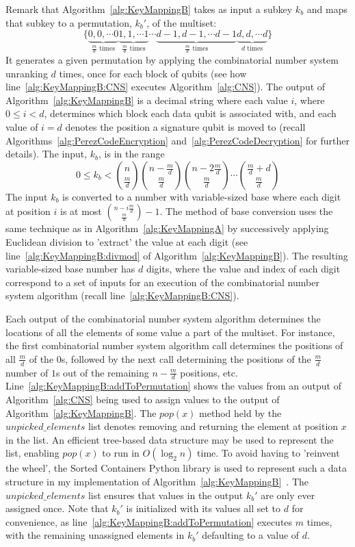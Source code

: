 Remark that Algorithm~\ref{alg:KeyMappingB} takes as input a subkey $k_b$ and maps that subkey to a permutation, $k_b'$, of the multiset:
\begin{equation}
    \{\underbrace{0, 0, \cdots 0}_{\frac{m}{d} \text{ times}}\underbrace{1, 1, \cdots 1}_{\frac{m}{d} \text{ times}}\cdots\underbrace{d-1, d-1, \cdots d-1}_{\frac{m}{d} \text{ times}}\underbrace{d, d, \cdots d}_{d \text{ times}}\}
\end{equation}
It generates a given permutation by applying the combinatorial number system unranking $d$ times, once for each block of qubits (see how line~\ref{alg:KeyMappingB:CNS} executes Algorithm~\ref{alg:CNS}). The output of Algorithm~\ref{alg:KeyMappingB} is a decimal string where each value $i$, where $0 \leq i < d$, determines which block each data qubit is associated with, and each value of $i = d$ denotes the position a signature qubit is moved to (recall Algorithms~\ref{alg:PerezCodeEncryption} and~\ref{alg:PerezCodeDecryption} for further details). 
The input, $k_b$, is in the range $$0 \leq k_b < {n \choose \frac{m}{d}}{n - \frac{m}{d} \choose \frac{m}{d}}{n - 2\frac{m}{d} \choose \frac{m}{d}}\cdots{\frac{m}{d} + d \choose \frac{m}{d}}$$ The input $k_b$ is converted to a number with variable-sized base where each digit at position $i$ is at most ${n - i\frac{m}{d} \choose \frac{m}{d}} - 1$. The method of base conversion uses the same technique as in Algorithm~\ref{alg:KeyMappingA} by successively applying Euclidean division to 'extract' the value at each digit (see line~\ref{alg:KeyMappingB:divmod} of Algorithm~\ref{alg:KeyMappingB}). The resulting variable-sized base number has $d$ digits, where the value and index of each digit correspond to a set of inputs for an execution of the combinatorial number system algorithm (recall line~\ref{alg:KeyMappingB:CNS}). 

Each output of the combinatorial number system algorithm determines the locations of all the elements of some value a part of the multiset. For instance, the first combinatorial number system algorithm call determines the positions of all $\frac{m}{d}$ of the $0$s, followed by the next call determining the positions of the $\frac{m}{d}$ number of $1$s out of the remaining $n - \frac{m}{d}$ positions, etc. Line~\ref{alg:KeyMappingB:addToPermutation} shows the values from an output of Algorithm~\ref{alg:CNS} being used to assign values to the output of Algorithm~\ref{alg:KeyMappingB}. The $pop(x)$ method held by the $\mathit{unpicked\_elements}$ list denotes removing and returning the element at position $x$ in the list. An efficient tree-based data structure may be used to represent the list, enabling $pop(x)$ to run in $O\left(\log_2 n\right)$ time. To avoid having to 'reinvent the wheel', the Sorted Containers Python library is used to represent such a data structure in my implementation of Algorithm~\ref{alg:KeyMappingB}~\cite{sortedContainers}. The $\mathit{unpicked\_elements}$ list ensures that values in the output $k_b'$ are only ever assigned once. Note that $k_b'$ is initialized with its values all set to $d$ for convenience, as line~\ref{alg:KeyMappingB:addToPermutation} executes $m$ times, with the remaining unassigned elements in $k_b'$ defaulting to a value of $d$.

